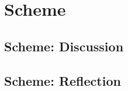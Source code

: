 \documentclass[
	12pt, %
]{fphw}
\begin{document}
\section{Scheme}

\subsection{Scheme: Discussion}

\subsection{Scheme: Reflection}
\end{document}
